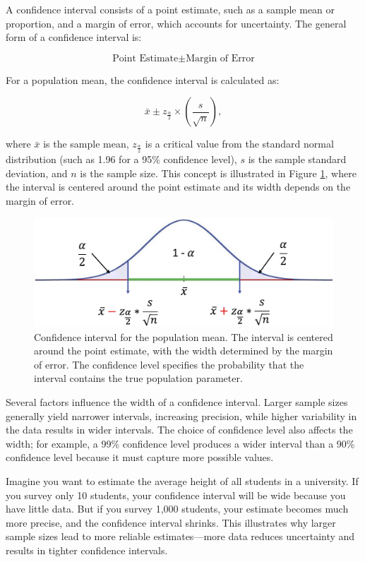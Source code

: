 \documentclass[
  11pt,
]{book}
\theoremstyle{definition}
\theoremstyle{definition}
\theoremstyle{definition}
\theoremstyle{definition}
\theoremstyle{remark}
\begin{document}
A confidence interval consists of a point estimate, such as a sample mean or proportion, and a margin of error, which accounts for uncertainty. The general form of a confidence interval is:

\[
\text{Point Estimate}  \pm \text{Margin of Error}
\]

For a population mean, the confidence interval is calculated as:

\[
\bar{x} \pm z_{\frac{\alpha}{2}} \times \left( \frac{s}{\sqrt{n}} \right),
\]

where \(\bar{x}\) is the sample mean, \(z_{\frac{\alpha}{2}}\) is a critical value from the standard normal distribution (such as 1.96 for a 95\% confidence level), \(s\) is the sample standard deviation, and \(n\) is the sample size. This concept is illustrated in Figure \ref{fig:confidence-interval}, where the interval is centered around the point estimate and its width depends on the margin of error.

\begin{figure}[H]

{\centering \includegraphics[width=0.8\linewidth]{images/ch5_confidence_interval} 

}

\caption{Confidence interval for the population mean. The interval is centered around the point estimate, with the width determined by the margin of error. The confidence level specifies the probability that the interval contains the true population parameter.}\label{fig:confidence-interval}
\end{figure}

Several factors influence the width of a confidence interval. Larger sample sizes generally yield narrower intervals, increasing precision, while higher variability in the data results in wider intervals. The choice of confidence level also affects the width; for example, a 99\% confidence level produces a wider interval than a 90\% confidence level because it must capture more possible values.

Imagine you want to estimate the average height of all students in a university. If you survey only 10 students, your confidence interval will be wide because you have little data. But if you survey 1,000 students, your estimate becomes much more precise, and the confidence interval shrinks. This illustrates why larger sample sizes lead to more reliable estimates---more data reduces uncertainty and results in tighter confidence intervals.
\end{document}
